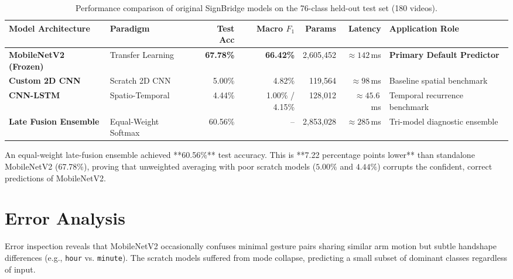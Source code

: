\begin{table}[htbp]
\centering
\caption{Performance comparison of original SignBridge models on the 76-class held-out test set (180 videos).}
\label{tab:model_comparison_benchmark}
\scriptsize
\begin{tabularx}{\textwidth}{l p{2.8cm} r r r r X}
\toprule
\textbf{Model Architecture} & \textbf{Paradigm} & \textbf{Test Acc} & \textbf{Macro $F_1$} & \textbf{Params} & \textbf{Latency} & \textbf{Application Role} \\
\midrule
\textbf{MobileNetV2 (Frozen)} & Transfer Learning & \textbf{67.78\%} & \textbf{66.42\%} & 2,605,452 & $\approx 142$\,ms & \textbf{Primary Default Predictor} \\
\textbf{Custom 2D CNN} & Scratch 2D CNN & 5.00\% & 4.82\% & 119,564 & $\approx 98$\,ms & Baseline spatial benchmark \\
\textbf{CNN-LSTM} & Spatio-Temporal & 4.44\% & 1.00\% / 4.15\% & 128,012 & $\approx 45.6$\,ms & Temporal recurrence benchmark \\
\midrule
\textbf{Late Fusion Ensemble} & Equal-Weight Softmax & 60.56\% & -- & 2,853,028 & $\approx 285$\,ms & Tri-model diagnostic ensemble \\
\bottomrule
\end{tabularx}
\end{table}

An equal-weight late-fusion ensemble achieved **60.56\%** test accuracy. This is **7.22 percentage points lower** than standalone MobileNetV2 (67.78\%), proving that unweighted averaging with poor scratch models ($5.00\%$ and $4.44\%$) corrupts the confident, correct predictions of MobileNetV2.

\section{Error Analysis}
\label{sec:error_analysis}
Error inspection reveals that MobileNetV2 occasionally confuses minimal gesture pairs sharing similar arm motion but subtle handshape differences (e.g., \texttt{hour} vs. \texttt{minute}). The scratch models suffered from mode collapse, predicting a small subset of dominant classes regardless of input.
